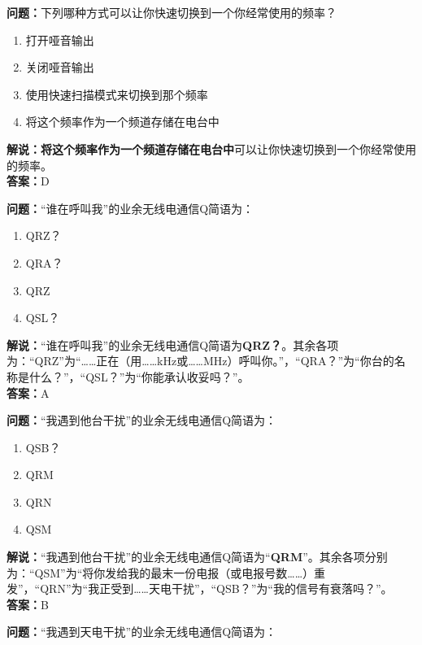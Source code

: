 \documentclass{ctexbook}
\begin{document}
\bigskip


\noindent\textbf{问题：}下列哪种方式可以让你快速切换到一个你经常使用的频率？
\begin{enumerate}[label=\Alph*), leftmargin=3em]
	\item 打开哑音输出
	\item 关闭哑音输出
	\item 使用快速扫描模式来切换到那个频率
	\item 将这个频率作为一个频道存储在电台中
\end{enumerate}
\noindent\textbf{解说：}\textbf{将这个频率作为一个频道存储在电台中}可以让你快速切换到一个你经常使用的频率。\\\noindent\textbf{答案：}D


\bigskip


\noindent\textbf{问题：}“谁在呼叫我”的业余无线电通信Q简语为：

\begin{enumerate}[label=\Alph*), leftmargin=3em]
	\item QRZ？
	\item QRA？
	\item QRZ
	\item QSL？
\end{enumerate}

\noindent\textbf{解说：}“谁在呼叫我”的业余无线电通信Q简语为\textbf{QRZ？}。其余各项为：“QRZ”为“……正在（用……kHz或……MHz）呼叫你。”，“QRA？”为“你台的名称是什么？”，“QSL？”为“你能承认收妥吗？”。\\\noindent\textbf{答案：}A


\bigskip


\noindent\textbf{问题：}“我遇到他台干扰”的业余无线电通信Q简语为：

\begin{enumerate}[label=\Alph*), leftmargin=3em]
	\item QSB？
	\item QRM
	\item QRN
	\item QSM
\end{enumerate}
\noindent\textbf{解说：}“我遇到他台干扰”的业余无线电通信Q简语为“\textbf{QRM}”。其余各项分别为：“QSM”为“将你发给我的最末一份电报（或电报号数……）重发”，“QRN”为“我正受到……天电干扰”，“QSB？”为“我的信号有衰落吗？”。\\\noindent\textbf{答案：}B


\bigskip


\noindent\textbf{问题：}“我遇到天电干扰”的业余无线电通信Q简语为：
\end{document}
